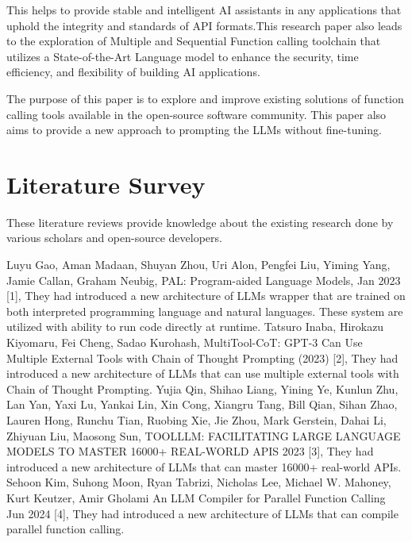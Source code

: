 \documentclass[conference]{IEEEtran}
\begin{document}
This helps to provide stable and intelligent AI assistants in any applications
that uphold the integrity and standards of API formats.This research paper also
leads to the exploration of Multiple and Sequential Function calling toolchain
that utilizes a State-of-the-Art Language model to enhance the security, time
efficiency, and flexibility of building AI applications.

The purpose of this paper is to explore and improve existing solutions of
function calling tools available in the open-source software community. This
paper also aims to provide a new approach to prompting the LLMs without
fine-tuning.

\section{Literature Survey}
These literature reviews provide knowledge about the existing research done by
various scholars and open-source developers.

    Luyu Gao, Aman Madaan, Shuyan Zhou, Uri Alon, Pengfei Liu, Yiming
Yang, Jamie Callan, Graham Neubig, PAL: Program-aided
Language Models, Jan 2023 [1], They had introduced a new architecture of LLMs wrapper that are trained on both interpreted programming language and natural languages. These system are utilized with ability to run code directly at runtime. Tatsuro Inaba, Hirokazu Kiyomaru, Fei Cheng, Sadao Kurohash,
MultiTool-CoT: GPT-3 Can Use Multiple External Tools with Chain
of Thought Prompting (2023) [2], They had introduced a new architecture of LLMs that can use multiple external tools with Chain of Thought Prompting. Yujia Qin, Shihao Liang, Yining Ye, Kunlun Zhu, Lan Yan, Yaxi Lu,
Yankai Lin, Xin Cong, Xiangru Tang, Bill Qian, Sihan Zhao, Lauren
Hong, Runchu Tian, Ruobing Xie, Jie Zhou, Mark Gerstein, Dahai Li, Zhiyuan Liu, Maosong Sun, TOOLLLM: FACILITATING LARGE
LANGUAGE MODELS TO MASTER 16000+ REAL-WORLD APIS 2023 [3], They had introduced a new architecture of LLMs that can master 16000+ real-world APIs. Sehoon Kim, Suhong Moon, Ryan Tabrizi, Nicholas Lee, Michael W.
Mahoney, Kurt Keutzer, Amir Gholami An LLM Compiler
for Parallel Function Calling Jun 2024 [4], They had introduced a new architecture of LLMs that can compile parallel function calling.
\end{document}

